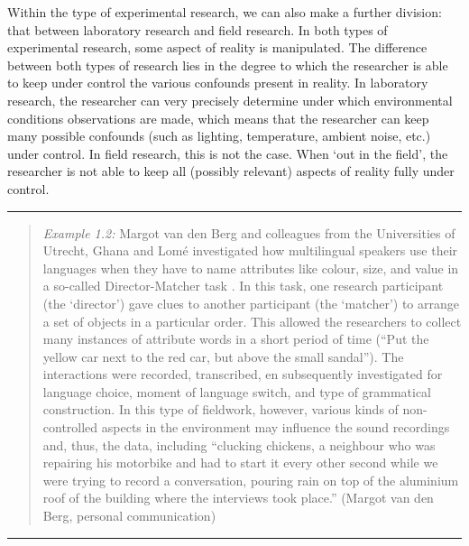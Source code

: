 \documentclass[
]{book}
\begin{document}
Within the type of experimental research, we can also make a further division: that between laboratory research and field research. In both types of experimental research, some aspect of reality is manipulated. The difference between both types of research lies in the degree to which the researcher is able to keep under control the various confounds present in reality. In laboratory research, the researcher can very precisely determine under which environmental conditions observations are made, which means that the researcher can keep many possible confounds (such as lighting, temperature, ambient noise, etc.) under control. In field research, this is not the case. When `out in the field', the researcher is not able to keep all (possibly relevant) aspects of reality fully under control.

\begin{center}\rule{0.5\linewidth}{0.5pt}\end{center}

\begin{quote}
\emph{Example 1.2:} Margot van den Berg and colleagues from the Universities of Utrecht, Ghana and Lomé investigated how multilingual speakers use their languages when they have to name attributes like colour, size, and value in a so-called Director-Matcher task \citep{BAEYT2017}. In this task, one research participant (the `director') gave clues to another participant (the `matcher') to arrange a set of objects in a particular order. This allowed the researchers to collect many instances of attribute words in a short period of time (``Put the yellow car next to the red car, but above the small sandal''). The interactions were recorded, transcribed, en subsequently investigated for language choice, moment of language switch, and type of grammatical construction. In this type of fieldwork, however, various kinds of non-controlled aspects in the environment may influence the sound recordings and, thus, the data, including ``clucking chickens, a neighbour who was repairing his motorbike and had to start it every other second while we were trying to record a conversation, pouring rain on top of the aluminium roof of the building where the interviews took place.'' (Margot van den Berg, personal communication)
\end{quote}

\begin{center}\rule{0.5\linewidth}{0.5pt}\end{center}
\end{document}
